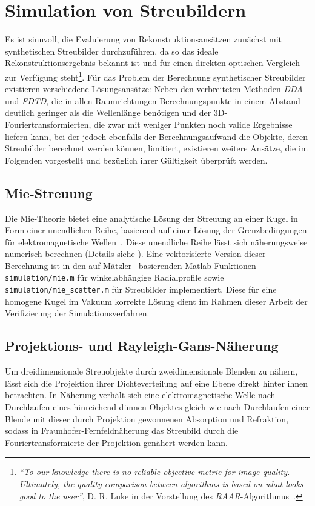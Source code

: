 \chapter{Simulation von Streubildern}
Es ist sinnvoll, die Evaluierung von Rekonstruktionsansätzen zunächst mit synthetischen Streubilder durchzuführen, da so das ideale Rekonstruktionsergebnis bekannt ist und für einen direkten optischen Vergleich zur Verfügung steht\footnote{\textit{"`To our
	knowledge there is no reliable objective metric for image quality. Ultimately, the quality
	comparison between algorithms is based on what looks good to the user"'}, D. R. Luke in der Vorstellung des \textit{RAAR}-Algorithmus~\cite{luke2004}.}. 
Für das Problem der Berechnung synthetischer Streubilder existieren verschiedene Lösungsansätze: Neben den verbreiteten Methoden \textit{DDA} und \textit{FDTD}, die in allen Raumrichtungen Berechnungspunkte in einem Abstand deutlich geringer als die Wellenlänge benötigen und der 3D-Fouriertransformierten, die zwar mit weniger Punkten noch valide Ergebnisse liefern kann, bei der jedoch ebenfalls der Berechnungsaufwand die Objekte, deren Streubilder berechnet werden können, limitiert, existieren weitere Ansätze, die im Folgenden vorgestellt und bezüglich ihrer Gültigkeit überprüft werden.

\section{Mie-Streuung}
Die Mie-Theorie bietet eine analytische Lösung der Streuung an einer Kugel in Form einer unendlichen Reihe, basierend auf einer Lösung der Grenzbedingungen für elektromagnetische Wellen~\cite{bohren2008}. Diese unendliche Reihe lässt sich näherungsweise numerisch berechnen (Details siehe ).
Eine vektorisierte Version dieser Berechnung ist in den auf Mätzler~\cite{maetzler2002} basierenden Matlab Funktionen \texttt{simulation/mie.m} für winkelabhängige Radialprofile sowie \texttt{simulation/mie\_scatter.m} für Streubilder implementiert. Diese für eine homogene Kugel im Vakuum korrekte Lösung dient im Rahmen dieser Arbeit der Verifizierung der Simulationsverfahren.

\section{Projektions- und Rayleigh-Gans-Näherung}
	
Um dreidimensionale Streuobjekte durch zweidimensionale Blenden zu nähern, lässt sich die Projektion ihrer Dichteverteilung auf eine Ebene direkt hinter ihnen betrachten. In Näherung verhält sich eine elektromagnetische Welle nach Durchlaufen eines hinreichend dünnen Objektes gleich wie nach Durchlaufen einer Blende mit dieser durch Projektion gewonnenen Absorption und Refraktion, sodass in Fraunhofer-Fernfeldnäherung das Streubild durch die Fouriertransformierte der Projektion genähert werden kann.
	

